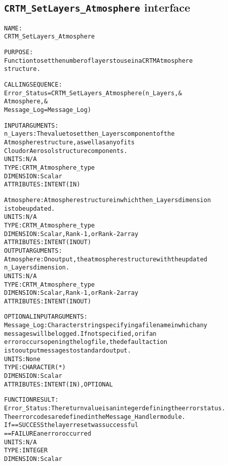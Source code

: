\subsection{\texttt{CRTM\_SetLayers\_Atmosphere} interface}
  \label{sec:CRTM_SetLayers_Atmosphere_interface}
  \begin{alltt}
 
  NAME:
        CRTM_SetLayers_Atmosphere
  
  PURPOSE:
        Function to set the number of layers to use in a CRTM Atmosphere
        structure.
 
  CALLING SEQUENCE:
        Error_Status = CRTM_SetLayers_Atmosphere( n_Layers               , &
                                                  Atmosphere             , &
                                                  Message_Log=Message_Log  )
 
  INPUT ARGUMENTS:
        n_Layers:     The value to set the n_Layers component of the 
                      Atmosphere structure, as well as any of its
                      Cloud or Aerosol structure components.
                      UNITS:      N/A
                      TYPE:       CRTM_Atmosphere_type
                      DIMENSION:  Scalar
                      ATTRIBUTES: INTENT(IN)
 
        Atmosphere:   Atmosphere structure in which the n_Layers dimension
                      is to be updated.
                      UNITS:      N/A
                      TYPE:       CRTM_Atmosphere_type
                      DIMENSION:  Scalar, Rank-1, or Rank-2 array
                      ATTRIBUTES: INTENT(IN OUT)
  OUTPUT ARGUMENTS:
        Atmosphere:   On output, the atmosphere structure with the updated
                      n_Layers dimension.
                      UNITS:      N/A
                      TYPE:       CRTM_Atmosphere_type
                      DIMENSION:  Scalar, Rank-1, or Rank-2 array
                      ATTRIBUTES: INTENT(IN OUT)
 
  OPTIONAL INPUT ARGUMENTS:
        Message_Log:  Character string specifying a filename in which any
                      messages will be logged. If not specified, or if an
                      error occurs opening the log file, the default action
                      is to output messages to standard output.
                      UNITS:      None
                      TYPE:       CHARACTER(*)
                      DIMENSION:  Scalar
                      ATTRIBUTES: INTENT(IN), OPTIONAL
 
  FUNCTION RESULT:
        Error_Status: The return value is an integer defining the error status.
                      The error codes are defined in the Message_Handler module.
                      If == SUCCESS the layer reset was successful
                         == FAILURE an error occurred
                      UNITS:      N/A
                      TYPE:       INTEGER
                      DIMENSION:  Scalar
 

\end{alltt}
